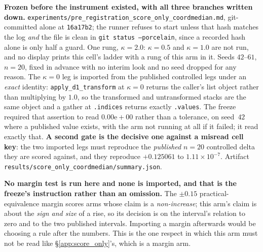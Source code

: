 \documentclass{article}
\begin{document}
\textbf{Frozen before the instrument existed, with all three branches written down.} \texttt{experiments/\allowbreak pre\_registration\_\allowbreak score\_only\_\allowbreak coordmedian.md}, git-committed alone at \texttt{16a17b2}; the runner refuses to start unless that hash matches the log \emph{and} the file is clean in \texttt{git status --porcelain}, since a recorded hash alone is only half a guard. One rung, $\kappa{=}2.0$: $\kappa{=}0.5$ and $\kappa{=}1.0$ are not run, and no display prints this cell's ladder with a rung of this arm in it. Seeds $42$--$61$, $n{=}20$, fixed in advance with no interim look and no seed dropped for any reason. The $\kappa{=}0$ leg is imported from the published controlled legs under an \emph{exact} identity: \texttt{apply\_d1\_transform} at $\kappa{=}0$ returns the caller's list object rather than multiplying by $1.0$, so the transformed and untransformed stacks are the same object and a gather at \texttt{.indices} returns exactly \texttt{.values}. The freeze required that assertion to read $0.00\mathrm{e}{+}00$ rather than a tolerance, on seed~$42$ where a published value exists, with the arm not running at all if it failed; it read exactly that. \textbf{A second gate is the decisive one against a misread cell key}: the two imported legs must reproduce the \emph{published} $n{=}20$ controlled delta they are scored against, and they reproduce $+0.125061$ to $1.11{\times}10^{-7}$. Artifact \texttt{results/\allowbreak score\_only\_coordmedian/\allowbreak summary.json}.

\textbf{No margin test is run here and none is imported, and that is the freeze's instruction rather than an omission.} The $\pm0.15$ practical-equivalence margin scores arms whose claim is a \emph{non-increase}; this arm's claim is about the \emph{sign and size} of a rise, so its decision is on the interval's relation to zero and to the two published intervals. Importing a margin afterwards would be choosing a rule after the numbers. This is the one respect in which this arm must not be read like §\ref{app:score_only}'s, which is a margin arm.
\end{document}
